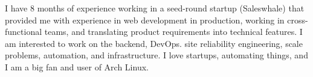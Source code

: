

\begin{cvparagraph}

  I have 8 months of experience working in a seed-round startup (Saleswhale) that provided me with experience in web development in production, working in cross-functional teams, and translating product requirements into technical features. I am interested to work on the backend, DevOps. site reliability engineering, scale problems, automation, and infrastructure. I love startups, automating things, and I am a big fan and user of Arch Linux.
\end{cvparagraph}
